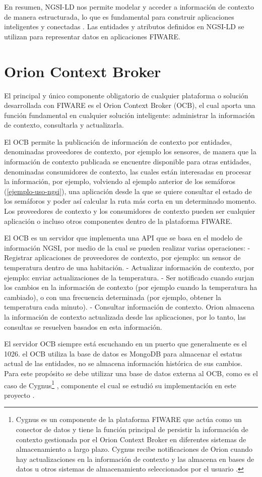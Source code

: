 En resumen, NGSI-LD nos permite modelar y acceder a información de contexto de manera estructurada, lo que es fundamental para construir aplicaciones inteligentes y conectadas \cite{fiware_ngsi_ld}. Las entidades y atributos definidos en NGSI-LD se utilizan para representar datos en aplicaciones FIWARE.


\section{Orion Context Broker}\label{orion-context-broker}
El principal y único componente obligatorio de cualquier plataforma o solución desarrollada con FIWARE es el Orion Context Broker (OCB), el cual aporta una función fundamental en cualquier solución inteligente: administrar la información de contexto, consultarla y actualizarla.

El OCB permite la publicación de información de contexto por entidades, denominadas proveedores de contexto, por ejemplo los sensores, de manera que la información de contexto publicada se encuentre disponible para otras entidades, denominadas consumidores de contexto, las cuales están interesadas en procesar la información, por ejemplo, volviendo al ejemplo anterior de los semáforos (\ref{ejemplo-uso-ngsi}), una aplicación desde la que se quiere consultar el estado de los semáforos y poder así calcular la ruta más corta en un determinado momento. Los proveedores de contexto y los consumidores de contexto pueden ser cualquier aplicación o incluso otros componentes dentro de la plataforma FIWARE.

El OCB es un servidor que implementa una API que se basa en el modelo de información NGSI, por medio de la cual se pueden realizar varias operaciones: - Registrar aplicaciones de proveedores de contexto, por ejemplo: un sensor de temperatura dentro de una habitación. - Actualizar información de contexto, por ejemplo: enviar actualizaciones de la temperatura. - Ser notificado cuando surjan los cambios en la información de contexto (por ejemplo cuando la temperatura ha cambiado), o con una frecuencia determinada (por ejemplo, obtener la temperatura cada minuto). - Consultar información de contexto. Orion almacena la información de contexto actualizada desde las aplicaciones, por lo tanto, las consultas se resuelven basados en esta información.

El servidor OCB siempre está escuchando en un puerto que generalmente es el 1026. el OCB utiliza la base de datos es MongoDB para almacenar el estatus actual de las entidades, no se almacena información histórica de sus cambios. Para este propósito se debe utilizar una base de datos externa al OCB, como es el caso de Cygnus\footnote{Cygnus es un componente de la plataforma FIWARE que actúa como un conector de datos y tiene la función principal de persistir la información de contexto gestionada por el Orion Context Broker en diferentes sistemas de almacenamiento a largo plazo. Cygnus recibe notificaciones de Orion cuando hay actualizaciones en la información de contexto y las almacena en bases de datos u otros sistemas de almacenamiento seleccionados por el usuario \cite{fiware_cygnus}.} , componente el cual se estudió su implementación en este proyecto  \cite{orion}.

